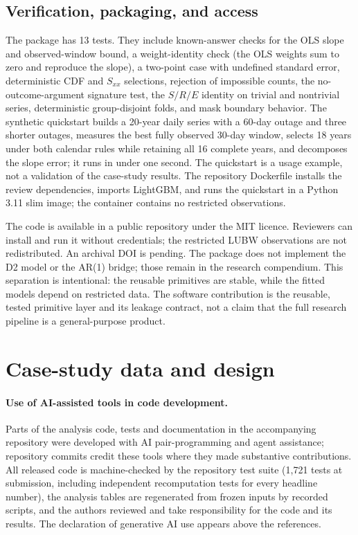 \subsection{Verification, packaging, and access}

The package has 13 tests. They include known-answer checks for the OLS slope and observed-window bound, a weight-identity check (the OLS weights sum to zero and reproduce the slope), a two-point case with undefined standard error, deterministic CDF and $S_{xx}$ selections, rejection of impossible counts, the no-outcome-argument signature test, the $S/R/E$ identity on trivial and nontrivial series, deterministic group-disjoint folds, and mask boundary behavior. The synthetic quickstart builds a 20-year daily series with a 60-day outage and three shorter outages, measures the best fully observed 30-day window, selects 18 years under both calendar rules while retaining all 16 complete years, and decomposes the slope error; it runs in under one second. The quickstart is a usage example, not a validation of the case-study results. The repository Dockerfile installs the review dependencies, imports LightGBM, and runs the quickstart in a Python 3.11 slim image; the container contains no restricted observations.

The code is available in a public repository under the MIT licence. Reviewers can install and run it without credentials; the restricted LUBW observations are not redistributed. An archival DOI is pending. The package does not implement the D2 model or the AR(1) bridge; those remain in the research compendium. This separation is intentional: the reusable primitives are stable, while the fitted models depend on restricted data. The software contribution is the reusable, tested primitive layer and its leakage contract, not a claim that the full research pipeline is a general-purpose product.

\section{Case-study data and design}

\paragraph{Use of AI-assisted tools in code development.} Parts of the analysis code, tests and documentation in the accompanying repository were developed with AI pair-programming and agent assistance; repository commits credit these tools where they made substantive contributions. All released code is machine-checked by the repository test suite (1{,}721 tests at submission, including independent recomputation tests for every headline number), the analysis tables are regenerated from frozen inputs by recorded scripts, and the authors reviewed and take responsibility for the code and its results. The declaration of generative AI use appears above the references.

